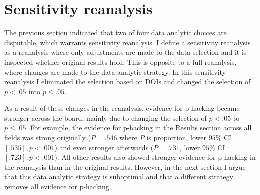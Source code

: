 \section*{Sensitivity reanalysis}
The previous section indicated that two of four data analytic choices are disputable, which warrants sensitivity reanalysis. I define a sensitivity reanalysis as a reanalysis where only adjustments are made to the data selection and it is inspected whether original results hold. This is opposite to a full reanalysis, where changes are made to the data analytic strategy. In this sensitivity reanalysis I eliminated the selection based on DOIs and changed the selection of $p<.05$ into $p\leq.05$.

As a result of these changes in the reanalysis, evidence for p-hacking became stronger across the board, mainly due to changing the selection of $p<.05$ to $p\leq.05$. For example, the evidence for p-hacking in the Results section across all fields was strong originally ($P=.546$ where $P$ is proportion, lower $95\%$ CI $[.535],p<.001$) and even stronger afterwards ($P=.731$, lower $95\%$ CI $[.723],p<.001$). All other results also showed stronger evidence for p-hacking in the reanalysis than in the original results. However, in the next section I argue that this data analytic strategy is suboptimal and that a different strategy removes all evidence for p-hacking.
  